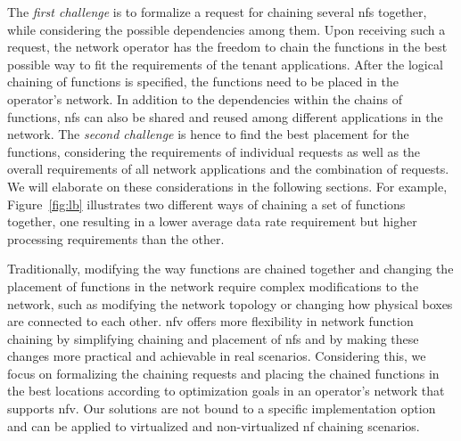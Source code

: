 \documentclass[10pt,a4paper,conference]{IEEEtran}
\begin{document}
The \emph{first challenge} is to formalize a request for chaining several \acp{nf} together, while considering
the possible dependencies among them. Upon receiving such a request, the network 
operator has the freedom to chain the functions in the best possible way to fit 
the requirements of the tenant applications. 
After the logical chaining of functions is specified, the functions need to be 
placed in the operator's network. In addition to the dependencies within the 
chains of functions, \acp{nf} can also be shared and reused among different 
applications in the network. The \emph{second challenge} is hence to find the best placement
for the functions, considering the requirements of individual requests as well as
the overall requirements of all network applications and the combination of requests.
We will elaborate on these considerations in the following sections. For example, 
Figure~\ref{fig:lb} illustrates two different ways of chaining a set of functions
together, one resulting in a lower average data rate requirement but higher processing 
requirements than the other. 

Traditionally, modifying the way functions are chained together and changing the
placement of functions in the network require complex modifications to the network, 
such as modifying the network topology or changing how physical boxes are connected
to each other. \ac{nfv} offers more flexibility in network function chaining by
simplifying chaining and placement of \acp{nf} and by 
making these changes more practical and achievable in real scenarios.  
Considering this, we focus on formalizing the chaining requests and placing the 
chained functions in the best locations according to optimization goals in an 
operator's network that supports \ac{nfv}. Our solutions are not bound to
a specific implementation option and can be applied to virtualized and non-virtualized
\ac{nf} chaining scenarios.
\end{document}
